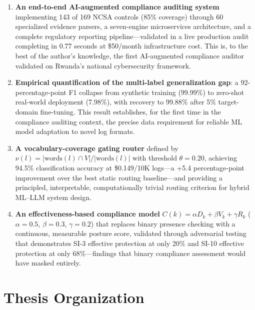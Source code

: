 \documentclass[12pt,oneside]{report}
\begin{document}
\begin{enumerate}
  \item \textbf{An end-to-end AI-augmented compliance auditing system} implementing 143 of 169 NCSA controls (85\% coverage) through 60 specialized evidence parsers, a seven-engine microservices architecture, and a complete regulatory reporting pipeline—validated in a live production audit completing in 0.77 seconds at \$50/month infrastructure cost. This is, to the best of the author's knowledge, the first AI-augmented compliance auditor validated on Rwanda's national cybersecurity framework.

  \item \textbf{Empirical quantification of the multi-label generalization gap}: a 92-percentage-point F1 collapse from synthetic training (99.99\%) to zero-shot real-world deployment (7.98\%), with recovery to 99.88\% after 5\% target-domain fine-tuning. This result establishes, for the first time in the compliance auditing context, the precise data requirement for reliable ML model adaptation to novel log formats.

  \item \textbf{A vocabulary-coverage gating router} defined by $\nu(l) = |\text{words}(l) \cap V| / |\text{words}(l)|$ with threshold $\theta = 0.20$, achieving 94.5\% classification accuracy at \$0.149/10K logs—a +5.4 percentage-point improvement over the best static routing baseline—and providing a principled, interpretable, computationally trivial routing criterion for hybrid ML--LLM system design.

  \item \textbf{An effectiveness-based compliance model} $C(k) = \alpha D_k + \beta V_k + \gamma R_k$ ($\alpha=0.5$, $\beta=0.3$, $\gamma=0.2$) that replaces binary presence checking with a continuous, measurable posture score, validated through adversarial testing that demonstrates SI-3 effective protection at only 20\% and SI-10 effective protection at only 68\%—findings that binary compliance assessment would have masked entirely.
\end{enumerate}

\section{Thesis Organization}
\end{document}

